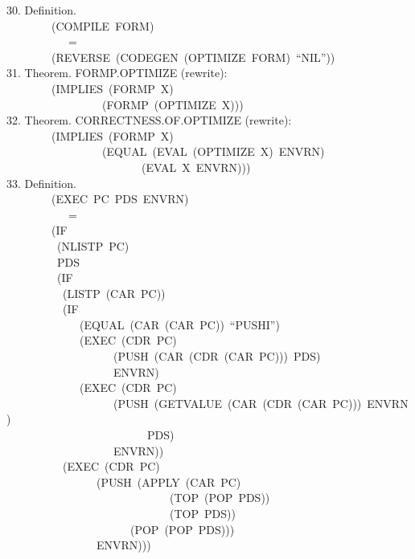 \documentclass[10pt]{book}
\newenvironment{pubasis}{\begin{flushleft}}{\end{flushleft}}
\begin{document}
\begin{pubasis}
30.     Definition.\\
~~~~~~~~(COMPILE~FORM)\\
~~~~~~~~~~~=\\
~~~~~~~~(REVERSE~(CODEGEN~(OPTIMIZE~FORM)~``NIL''))\\

31.     Theorem.  FORMP.OPTIMIZE (rewrite):\\
~~~~~~~~(IMPLIES~(FORMP~X)\\
~~~~~~~~~~~~~~~~~(FORMP~(OPTIMIZE~X)))\\

32.     Theorem.  CORRECTNESS.OF.OPTIMIZE (rewrite):\\
~~~~~~~~(IMPLIES~(FORMP~X)\\
~~~~~~~~~~~~~~~~~(EQUAL~(EVAL~(OPTIMIZE~X)~ENVRN)\\
~~~~~~~~~~~~~~~~~~~~~~~~(EVAL~X~ENVRN)))\\

33.     Definition.\\
~~~~~~~~(EXEC~PC~PDS~ENVRN)\\
~~~~~~~~~~~=\\
~~~~~~~~(IF\\
~~~~~~~~~(NLISTP~PC)\\
~~~~~~~~~PDS\\
~~~~~~~~~(IF\\
~~~~~~~~~~(LISTP~(CAR~PC))\\
~~~~~~~~~~(IF\\
~~~~~~~~~~~~~(EQUAL~(CAR~(CAR~PC))~``PUSHI'')\\
~~~~~~~~~~~~~(EXEC~(CDR~PC)\\
~~~~~~~~~~~~~~~~~~~(PUSH~(CAR~(CDR~(CAR~PC)))~PDS)\\
~~~~~~~~~~~~~~~~~~~ENVRN)\\
~~~~~~~~~~~~~(EXEC~(CDR~PC)\\
~~~~~~~~~~~~~~~~~~~(PUSH~(GETVALUE~(CAR~(CDR~(CAR~PC)))~ENVRN)\\
~~~~~~~~~~~~~~~~~~~~~~~~~PDS)\\
~~~~~~~~~~~~~~~~~~~ENVRN))\\
~~~~~~~~~~(EXEC~(CDR~PC)\\
~~~~~~~~~~~~~~~~(PUSH~(APPLY~(CAR~PC)\\
~~~~~~~~~~~~~~~~~~~~~~~~~~~~~(TOP~(POP~PDS))\\
~~~~~~~~~~~~~~~~~~~~~~~~~~~~~(TOP~PDS))\\
~~~~~~~~~~~~~~~~~~~~~~(POP~(POP~PDS)))\\
~~~~~~~~~~~~~~~~ENVRN)))\\


\end{pubasis}
\end{document}
